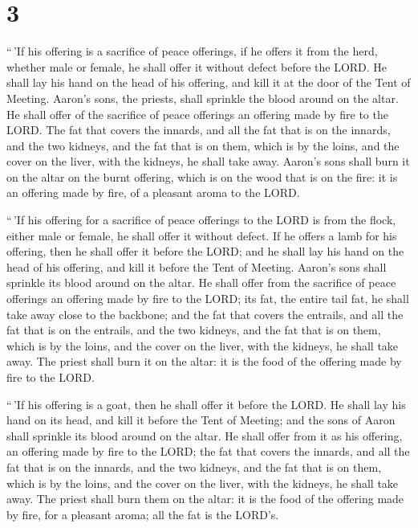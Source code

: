 \hypertarget{section-2}{%
\section{3}\label{section-2}}

 ``\,'If his offering is a sacrifice of peace offerings,
if he offers it from the herd, whether male or female, he shall offer it
without defect before the LORD.  He shall lay his hand on
the head of his offering, and kill it at the door of the Tent of
Meeting. Aaron's sons, the priests, shall sprinkle the blood around on
the altar.  He shall offer of the sacrifice of peace
offerings an offering made by fire to the LORD. The fat that covers the
innards, and all the fat that is on the innards,  and the
two kidneys, and the fat that is on them, which is by the loins, and the
cover on the liver, with the kidneys, he shall take away. 
Aaron's sons shall burn it on the altar on the burnt offering, which is
on the wood that is on the fire: it is an offering made by fire, of a
pleasant aroma to the LORD.

 ``\,'If his offering for a sacrifice of peace offerings
to the LORD is from the flock, either male or female, he shall offer it
without defect.  If he offers a lamb for his offering,
then he shall offer it before the LORD;  and he shall lay
his hand on the head of his offering, and kill it before the Tent of
Meeting. Aaron's sons shall sprinkle its blood around on the altar.
 He shall offer from the sacrifice of peace offerings an
offering made by fire to the LORD; its fat, the entire tail fat, he
shall take away close to the backbone; and the fat that covers the
entrails, and all the fat that is on the entrails,  and
the two kidneys, and the fat that is on them, which is by the loins, and
the cover on the liver, with the kidneys, he shall take away.
 The priest shall burn it on the altar: it is the food of
the offering made by fire to the LORD.

 ``\,'If his offering is a goat, then he shall offer it
before the LORD.  He shall lay his hand on its head, and
kill it before the Tent of Meeting; and the sons of Aaron shall sprinkle
its blood around on the altar.  He shall offer from it as
his offering, an offering made by fire to the LORD; the fat that covers
the innards, and all the fat that is on the innards,  and
the two kidneys, and the fat that is on them, which is by the loins, and
the cover on the liver, with the kidneys, he shall take away.
 The priest shall burn them on the altar: it is the food
of the offering made by fire, for a pleasant aroma; all the fat is the
LORD's.

